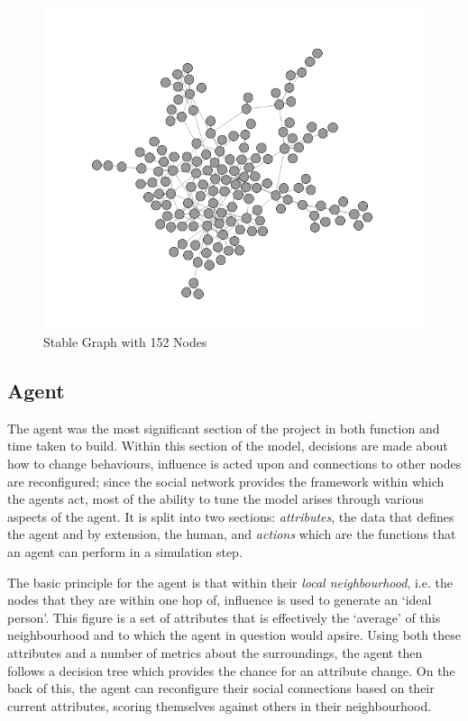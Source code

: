 \documentclass[]{report}
\begin{document}
\begin{figure}
\begin{center}
\includegraphics[scale=0.5]{post-balance.png}
\end{center}
\caption{Stable Graph with 152 Nodes}
\label{img:post-watchman}
\end{figure}

\subsection{Agent}
\label{sec:agent}
The agent was the most significant section of the project in both function and time taken to build. Within this section of the model, decisions are made about how to change behaviours, influence is acted upon and connections to other nodes are reconfigured; since the social network provides the framework within which the agents act, most of the ability to tune the model arises through various aspects of the agent. It is split into two sections: \emph{attributes}, the data that defines the agent and by extension, the human, and \emph{actions} which are the functions that an agent can perform in a simulation step.

The basic principle for the agent is that within their \emph{local neighbourhood}, i.e. the nodes that they are within one hop of, influence is used to generate an `ideal person'. This figure is a set of attributes that is effectively the `average' of this neighbourhood and to which the agent in question would apsire. Using both these attributes and a number of metrics about the surroundings, the agent then follows a decision tree which provides the chance for an attribute change. On the back of this, the agent can reconfigure their social connections based on their current attributes, scoring themselves against others in their neighbourhood.
\end{document}
